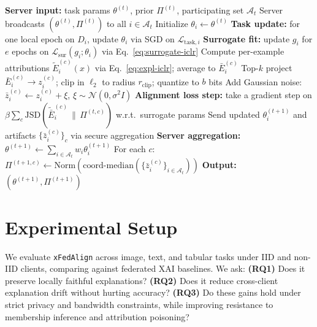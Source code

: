 \documentclass{article}
\theoremstyle{plain}
\theoremstyle{definition}
\theoremstyle{remark}
\begin{document}
\begin{algorithm}[h]
\caption{\texttt{xFedAlign}: one communication round $t$}
\label{alg:xfedalign}
\begin{algorithmic}[1]
\STATE \textbf{Server input:} task params $\theta^{(t)}$, prior $\Pi^{(t)}$, participating set $\mathcal{A}_t$
\STATE Server broadcasts $(\theta^{(t)}, \Pi^{(t)})$ to all $i \in \mathcal{A}_t$
  \STATE Initialize $\theta_i \gets \theta^{(t)}$
  \STATE \textbf{Task update:} for one local epoch on $D_i$, update $\theta_i$ via SGD on $\mathcal{L}_{\mathrm{task},i}$
    \STATE \textbf{Surrogate fit:} update $g_i$ for $e$ epochs on $\mathcal{L}_{\mathrm{sur}}(g_i; \theta_i)$ via Eq.~\eqref{eq:surrogate-iclr}
  \ENDIF
    \STATE Compute per-example attributions $\tilde{E}_i^{(c)}(x)$ via Eq.~\eqref{eq:expl-iclr}; average to $\bar{E}_i^{(c)}$
    \STATE Top-$k$ project $\bar{E}_i^{(c)} \to z_i^{(c)}$; clip in $\ell_2$ to radius $r_{\mathrm{clip}}$; quantize to $b$ bits
    \STATE Add Gaussian noise: $\bar{z}_i^{(c)} \gets z_i^{(c)} + \xi$, $\xi \sim \mathcal{N}(0, \sigma^2 I)$
  \ENDFOR
  \STATE \textbf{Alignment loss step:} take a gradient step on $\beta \sum_c \mathrm{JSD}(\tilde{\bar{E}}_i^{(c)} \,\|\, \Pi^{(t,c)})$ w.r.t.\ surrogate params
  \STATE Send updated $\theta_i^{(t+1)}$ and artifacts $\{\bar{z}_i^{(c)}\}_c$ via secure aggregation
\ENDFOR
\STATE \textbf{Server aggregation:}
\STATE \quad $\theta^{(t+1)} \gets \sum_{i \in \mathcal{A}_t} w_i \theta_i^{(t+1)}$
\STATE \quad For each $c$: $\Pi^{(t+1, c)} \gets \mathrm{Norm}(\mathrm{coord\text{-}median}(\{\bar{z}_i^{(c)}\}_{i \in \mathcal{A}_t}))$
\STATE \textbf{Output:} $(\theta^{(t+1)}, \Pi^{(t+1)})$
\end{algorithmic}
\end{algorithm}



\section{Experimental Setup}
\label{experimental-setup}

We evaluate \texttt{xFedAlign} across image, text, and tabular tasks under IID and non-IID clients, comparing against federated XAI baselines. We ask: \textbf{(RQ1)} Does it preserve locally faithful explanations? \textbf{(RQ2)} Does it reduce cross-client explanation drift without hurting accuracy? \textbf{(RQ3)} Do these gains hold under strict privacy and bandwidth constraints, while improving resistance to membership inference and attribution poisoning?
\end{document}
